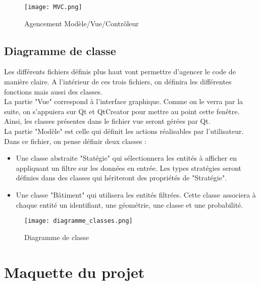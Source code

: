 \begin{figure}[H]
	\begin{center}
		\texttt{[image: MVC.png]}  \\
		\caption[Agencement Modèle/Vue/Contrôleur]{Agencement Modèle/Vue/Contrôleur}
		\label{fig:MVC}
	\end{center}
\end{figure}

\subsection{Diagramme de classe}

Les différents fichiers définis plus haut vont permettre d'agencer le code de manière claire. A l'intérieur de ces trois fichiers, on définira les différentes fonctions mais aussi des classes.\\

La partie "Vue" correspond à l'interface graphique. Comme on le verra par la suite, on s'appuiera sur Qt et QtCreator pour mettre au point cette fenêtre. Ainsi, les classes présentes dans le fichier vue seront gérées par Qt.\\

La partie "Modèle" est celle qui définit les actions réalisables par l'utilisateur. Dans ce fichier, on pense définir deux classes :
\begin{itemize}[label=$\rightarrow$]
	\item Une classe abstraite "Statégie" qui sélectionnera les entités à afficher en appliquant un filtre sur les données en entrée. Les types stratégies seront définies dans des classes qui hériteront des propriétés de "Stratégie".
	\item Une classe "Bâtiment" qui utilisera les entités filtrées. Cette classe associera à chaque entité un identifiant, une géométrie, une classe et une probabilité.\\
\end{itemize}


\begin{figure}[H]
	\begin{center}
		\texttt{[image: diagramme\_classes.png]}  \\
		\caption[Diagramme de classe]{Diagramme de classe}
		\label{fig:classe}
	\end{center}
\end{figure}

\section{Maquette du projet}

